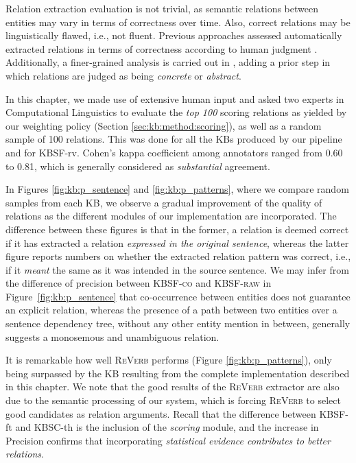 Relation extraction evaluation is not trivial, as semantic relations between entities may vary in terms of correctness over time. Also, correct relations may be linguistically flawed, i.e., not fluent. Previous approaches assessed automatically extracted relations in terms of correctness according to human judgment \citep{Fader2011,Mausam2012}. Additionally, a finer-grained analysis is carried out in \cite{Bankoetal2007}, adding a prior step in which relations are judged as being \textit{concrete} or \textit{abstract}.

In this chapter, we made use of extensive human input and asked two experts in Computational Linguistics to evaluate the \textit{top 100} scoring relations as yielded by our weighting policy (Section \ref{sec:kb:method:scoring}), as well as a random sample of 100 relations. This was done for all the KBs produced by our pipeline and for \textsc{KBSF}-rv. Cohen's kappa coefficient among annotators ranged from 0.60 to 0.81, which is generally considered as \textit{substantial} agreement.


In Figures \ref{fig:kb:p_sentence} and \ref{fig:kb:p_patterns}, where we compare random samples from each KB, we observe a gradual improvement of the quality of relations as the different modules of our implementation are incorporated. The difference between these figures is that in the former, a relation is deemed correct if it has extracted a relation \textit{expressed in the original sentence}, whereas the latter figure reports numbers on whether the extracted relation pattern was correct, i.e., if it \textit{meant} the same as it was intended in the source sentence. We may infer from the difference of precision between \textsc{KBSF-co} and \textsc{KBSF-raw} in Figure~\ref{fig:kb:p_sentence} that co-occurrence between entities does not guarantee an explicit relation, whereas the presence of a path between two entities over a sentence dependency tree, without any other entity mention in between, generally suggests a monosemous and unambiguous relation.

It is remarkable how well \textsc{ReVerb} performs (Figure \ref{fig:kb:p_patterns}), only being surpassed by the KB resulting from the complete implementation described in this chapter. We note that the good results of the \textsc{ReVerb} extractor are also due to the semantic processing of our system, which is forcing \textsc{ReVerb} to select good candidates as relation arguments. Recall that the difference between \textsc{KBSF}-ft and \textsc{KBSC}-th is the inclusion of the \textit{scoring} module, and the increase in Precision confirms that incorporating \textit{statistical evidence contributes to better relations}.

